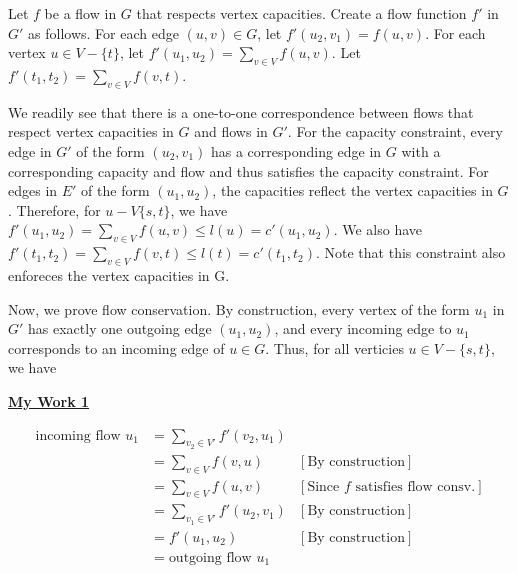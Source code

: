 \documentclass[12pt]{article}
\begin{document}
\begin{enumerate}[1.]
\begin{enumerate}[a)]
        Let $f$ be a flow in $G$ that respects vertex capacities. Create a flow function
        $f'$ in $G'$ as follows. For each edge $(u,v) \in G$, let $f'(u_2, v_1) = f(u,v)$.
        For each vertex $u \in V - \{t\}$, let $f'(u_1, u_2) = \sum\limits_{v \in V} f(u,v)$.
        Let $f'(t_1, t_2) = \sum\limits_{v \in V} f(v,t)$.

        \bigskip

        We readily see that there is a one-to-one correspondence between flows that respect
        vertex capacities in $G$ and flows in $G'$. For the capacity constraint, every edge
        in $G'$ of the form $(u_2, v_1)$ has a corresponding edge in $G$ with a corresponding
        capacity and flow and thus satisfies the capacity constraint. For edges in $E'$ of
        the form $(u_1, u_2)$, the capacities reflect the vertex capacities in $G$. Therefore,
        for $u - V \{s,t\}$, we have $f'(u_1, u_2) = \sum\limits_{v \in V} f(u,v) \leq l(u) = c'(u_1, u_2)$.
        We also have $f'(t_1, t_2) = \sum\limits_{v \in V} f(v,t) \leq l(t) = c'(t_1, t_2)$. Note
        that this constraint also enforeces the vertex capacities in G.

        \bigskip

        Now, we prove flow conservation. By construction, every vertex of the form $u_1$
        in $G'$ has exactly one outgoing edge $(u_1, u_2)$, and every incoming edge to $u_1$
        corresponds to an incoming edge of $u \in G$. Thus, for all verticies $u \in V - \{s,t\}$,
        we have

        \bigskip

        \begin{mdframed}
        \underline{\textbf{My Work 1}}

        \bigskip

        \begin{align}
        \text{incoming flow $u_1$} &= \sum\limits_{v_2 \in V'} f'(v_2, u_1)\\
        &= \sum\limits_{v \in V} f(v,u) & [\text{By construction}]\\
        &= \sum\limits_{v \in V} f(u,v) & [\text{Since $f$ satisfies flow consv.}]\\
        &= \sum\limits_{v_1 \in V'} f'(u_2,v_1) & [\text{By construction}]\\
        &= f'(u_1,u_2) & [\text{By construction}]\\
        &= \text{outgoing flow $u_1$}
        \end{align}


\end{mdframed}
\end{enumerate}
\end{enumerate}
\end{document}
